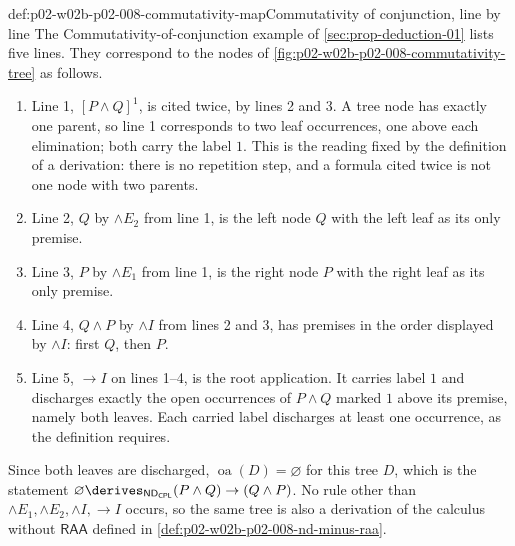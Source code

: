 \begin{hbexample}{def:p02-w02b-p02-008-commutativity-map}{Commutativity of conjunction, line by line}
The Commutativity-of-conjunction example of \cref{sec:prop-deduction-01}
lists five lines.  They correspond to the nodes of
\cref{fig:p02-w02b-p02-008-commutativity-tree} as follows.
\begin{enumerate}
  \item Line 1, \([P\land Q]^1\), is cited twice, by lines 2 and 3.  A tree
        node has exactly one parent, so line 1 corresponds to two leaf
        occurrences, one above each elimination; both carry the label \(1\).
        This is the reading fixed by the definition of a derivation: there
        is no repetition step, and a formula cited twice is not one node
        with two parents.
  \item Line 2, \(Q\) by \(\land E_2\) from line 1, is the left node \(Q\)
        with the left leaf as its only premise.
  \item Line 3, \(P\) by \(\land E_1\) from line 1, is the right node \(P\)
        with the right leaf as its only premise.
  \item Line 4, \(Q\land P\) by \(\land I\) from lines 2 and 3, has premises
        in the order displayed by \(\land I\): first \(Q\), then \(P\).
  \item Line 5, \(\to I\) on lines 1--4, is the root application.  It
        carries label \(1\) and discharges exactly the open occurrences of
        \(P\land Q\) marked \(1\) above its premise, namely both leaves.
        Each carried label discharges at least one occurrence, as the
        definition requires.
\end{enumerate}
Since both leaves are discharged, \(\operatorname{oa}(D)=\varnothing\) for
this tree \(D\), which is the statement
\(\varnothing\derives_{\mathsf{ND}_{\mathsf{CPL}}}(P\land Q)\to(Q\land P)\).
No rule other than \(\land E_1,\land E_2,\land I,\to I\) occurs, so the same
tree is also a derivation of the calculus without \(\mathsf{RAA}\) defined
in \cref{def:p02-w02b-p02-008-nd-minus-raa}.
\end{hbexample}

